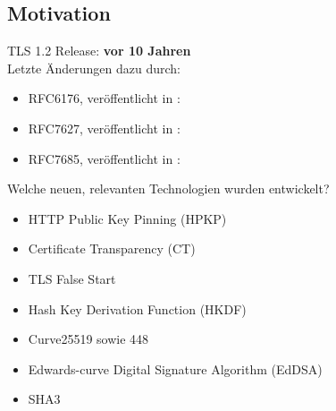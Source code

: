 \documentclass{f4_beamer_metropolis}
\begin{document}
\subsection{Motivation}

\begin{frame}{TLS 1.2}
Release: \textbf{vor 10 Jahren} \\
Letzte Änderungen dazu durch:
\begin{itemize}
    \item RFC6176, veröffentlicht in \textbf{\citeyear{RFC6176}}: \newline
    \textit{}
    \item RFC7627, veröffentlicht in \textbf{\citeyear{RFC7627}}: \newline
    \textit{}
    \item RFC7685, veröffentlicht in \textbf{\citeyear{RFC7685}}: \newline
    \textit{}
\end{itemize}
\end{frame}

\begin{frame}{Welche neuen, relevanten Technologien wurden entwickelt?}
  \begin{itemize}
    \item HTTP Public Key Pinning (HPKP) \autocite{RFC7469}
    \item Certificate Transparency (CT) \autocite{RFC6962}
    \item TLS False Start \autocite{RFC7918}
    \item Hash Key Derivation Function (HKDF) \autocite{RFC5869}
    \item Curve25519 sowie 448 \autocite{RFC7748}
    \item Edwards-curve Digital Signature Algorithm (EdDSA) \autocite{RFC8032}
    \item SHA3
  \end{itemize}

  \end{frame}
\end{document}
